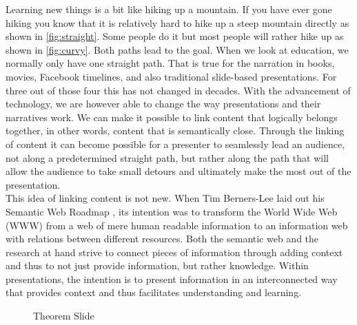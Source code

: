 \documentclass[twoside, 12pt]{article}
\begin{document}
Learning new things is a bit like hiking up a mountain. If you have ever gone hiking you know that it is relatively hard to hike up a steep mountain directly as shown in \autoref{fig:straight}. Some people do it but most people will rather hike up as shown in \autoref{fig:curvy}. Both paths lead to the goal. When we look at education, we normally only have one straight path. That is true for the narration in books, movies, Facebook timelines, and also traditional slide-based presentations. For three out of those four this has not changed in decades. With the advancement of technology, we are however able to change the way presentations and their narratives work. We can make it possible to link content that logically belongs together, in other words, content that is semantically close. Through the linking of content it can become possible for a presenter to seamlessly lead an audience, not along a predetermined straight path, but rather along the path that will allow the audience to take small detours and ultimately make the most out of the presentation.\\

This idea of linking content is not new. When Tim Berners-Lee laid out his Semantic Web Roadmap \cite{BernersLee:tsw98}, its intention was to transform the World Wide Web (WWW) from a web of mere human readable information to an information web with relations between different resources. Both the semantic web and the research at hand strive to connect pieces of information through adding context and thus to not just provide information, but rather knowledge. Within presentations, the intention is to present information in an interconnected way that provides context and thus facilitates understanding and learning.\\

\begin{figure}
\vspace{-28pt}
  \begin{center}
  \end{center}
\vspace{-20pt}
  \caption{Theorem Slide}
  \label{fig:slideP}
\vspace{-15pt}
\end{figure}
\end{document}
